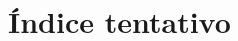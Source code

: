 \documentclass[../proyecto.tex]{subfiles}
\begin{document}
\section{Índice tentativo}

\end{document}
